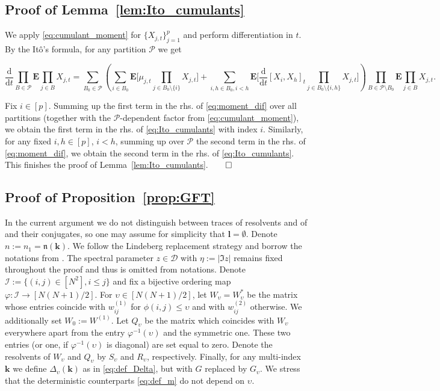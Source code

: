 \documentclass[10pt]{amsart}
\numberwithin{equation}{section}
\newcommand{\dif}{\mathrm{d}}
\newcommand{\E}{\mathbf{E}}
\begin{document}
\subsection{Proof of Lemma~\ref{lem:Ito_cumulants}}\label{app:Ito_cumulants} We apply \eqref{eq:cumulant_moment} for $\{X_{j,t}\}_{j=1}^p$ and perform differentiation in $t$. By the It\^{o}'s formula, for any partition $\mathcal{P}$ we get
\begin{small} 
\begin{equation}
\frac{\dif}{\dif t} \prod_{B\in \mathcal{P}} \E \prod_{j\in B} X_{j,t} \!=\!\! \sum_{B_0\in\mathcal{P}}\left(\sum_{i\in B_0}\E\Bigg[ \mu_{j,t}\!\!\!\!\!\prod_{j\in B_0\setminus\{i\}}\!\!\! X_{j,t}\Bigg] +\!\!\!\! \sum_{i,h\in B_0, i<h}\!\!\E\Bigg[ \frac{\dif}{\dif t}[X_i,X_h]_t\!\!\!\!\!\prod_{j\in B_0\setminus\{i,h\}}\!\!\! X_{j,t}\Bigg] \right) \!\!\!\prod_{B\in\mathcal{P}\setminus B_0} \!\!\!\!\E \prod_{j\in B} \!X_{j,t}.
\end{equation}
\label{eq:moment_dif}
\end{small}
Fix $i\in [p]$. Summing up the first term in the rhs. of \eqref{eq:moment_dif} over all partitions (together with the $\mathcal{P}$-dependent factor from \eqref{eq:cumulant_moment}), we obtain the first term in the rhs. of \eqref{eq:Ito_cumulants} with index $i$. Similarly, for any fixed $i,h\in [p]$, $i<h$, summing up over $\mathcal{P}$ the second term in the rhs. of \eqref{eq:moment_dif}, we obtain the second term in the rhs. of \eqref{eq:Ito_cumulants}. This finishes the proof of Lemma~\ref{lem:Ito_cumulants}.\hfill $\qed$


\subsection{Proof of Proposition~\ref{prop:GFT}}\label{app:GFT}

In the current argument we do not distinguish between traces of resolvents and of and their conjugates, so one may assume for simplicity that $\bm{l}=\emptyset$. Denote $n:=n_1=\mathfrak{n}(\bm{k})$. We follow the Lindeberg replacement strategy \cite{TaoVu11} and borrow the notations from \cite[Sec.16.1]{erdHos2017dynamical}. The spectral parameter $z\in\mathcal{D}$ with $\eta:=|\Im z|$ remains fixed throughout the proof and thus is omitted from notations. Denote $\mathcal{I}:=\{(i,j)\in [N^2], i\le j\}$ and fix a bijective ordering map $\varphi: \mathcal{I}\to [N(N+1)/2]$. For $\upsilon\in [N(N+1)/2]$, let $W_\upsilon=W_\upsilon^*$ be the matrix whose entries coincide with $w_{ij}^{(1)}$ for $\phi(i,j)\le \upsilon$ and with $w_{ij}^{(2)}$ otherwise. We additionally set $W_0:=W^{(1)}$. Let $Q_\upsilon$ be the matrix which coincides with $W_\upsilon$ everywhere apart from the entry $\varphi^{-1}(\upsilon)$ and the symmetric one. These two entries (or one, if $\varphi^{-1}(\upsilon)$ is diagonal) are set equal to zero. Denote the resolvents of $W_\upsilon$ and $Q_\upsilon$ by $S_\upsilon$ and $R_\upsilon$, respectively. Finally, for any multi-index $\bm{k}$ we define $\Delta_\upsilon(\bm{k})$ as in \eqref{eq:def_Delta}, but with $G$ replaced by $G_\upsilon$. We stress that the deterministic counterparts \eqref{eq:def_m} do not depend on $\upsilon$.
\end{document}
